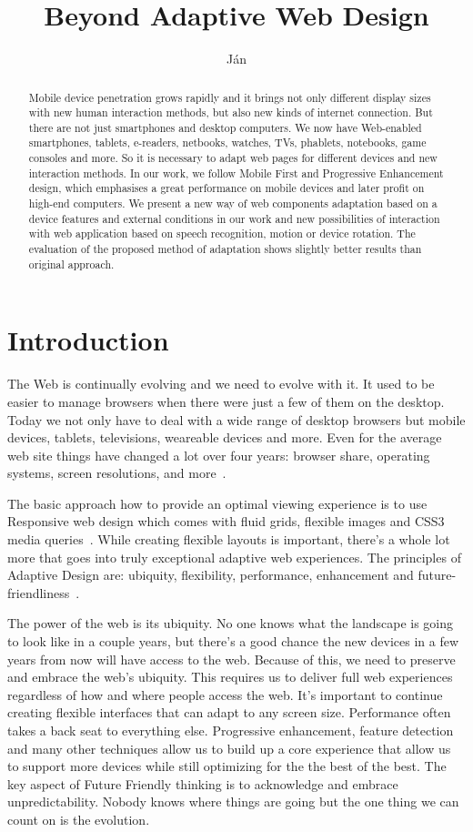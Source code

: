 \documentclass{iitsrc}
\title{Beyond Adaptive Web Design}
\author{Ján}{Antala}
\begin{document}
\begin{abstract}
Mobile device penetration grows rapidly and it brings not only different display sizes with new human interaction methods, but also new kinds of internet connection. But there are not just smartphones and desktop computers. We now have Web-enabled smartphones, tablets, e-readers, netbooks, watches, TVs, phablets, notebooks, game consoles and more. So it is necessary to adapt web pages for different devices and new interaction methods. In our work, we follow Mobile First and Progressive Enhancement design, which emphasises a great performance on mobile devices and later profit on high-end computers. We present a new way of web components adaptation based on a device features and external conditions in our work and new possibilities of interaction with web application based on speech recognition, motion or device rotation. The evaluation of the proposed method of adaptation shows slightly better results than original approach.
\end{abstract}

\section{Introduction}

The Web is continually evolving and we need to evolve with it. It used to be easier to manage browsers when there were just a few of them on the desktop. Today we not only have to deal with a wide range of desktop browsers but mobile devices, tablets, televisions, weareable devices and more. Even for the average web site things have changed a lot over four years: browser share, operating systems, screen resolutions, and more~\cite{ui17}.

The basic approach how to provide an optimal viewing experience is to use Responsive web design which comes with fluid grids, flexible images and CSS3 media queries~\cite{responsive}. While creating flexible layouts is important, there’s a whole lot more that goes into truly exceptional adaptive web experiences. The principles of Adaptive Design are: ubiquity, flexibility, performance, enhancement and future-friendliness~\cite{adaptivesxsw}.

The power of the web is its ubiquity. No one knows what the landscape is going to look like in a couple years, but there’s a good chance the new devices in a few years from now will have access to the web. Because of this, we need to preserve and embrace the web’s ubiquity. This requires us to deliver full web experiences regardless of how and where people access the web. It's important to continue creating flexible interfaces that can adapt to any screen size. Performance often takes a back seat to everything else. Progressive enhancement, feature detection and many other techniques allow us to build up a core experience that allow us to support more devices while still optimizing for the the best of the best. The key aspect of Future Friendly thinking is to acknowledge and embrace unpredictability. Nobody knows where things are going but the one thing we can count on is the evolution.
\end{document}
